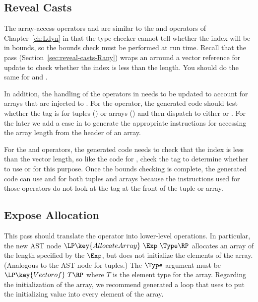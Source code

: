 \documentclass[7x10,nocrop]{TimesAPriori_MIT}%
\begin{document}
{\subsection{Reveal Casts}

The array-access operators  and
 are similar to the  and
 operators of Chapter~\ref{ch:Ldyn} in
that the type checker cannot tell whether the index will be in bounds,
so the bounds check must be performed at run time.  Recall that the
 pass (Section~\ref{sec:reveal-casts-Rany}) wraps
an  arround a vector reference for update to check whether
the index is less than the length.  You should do the same for
 and  .

In addition, the handling of the  operators in
 needs to be updated to account for arrays that are
injected to . For the  operator, the
generated code should test whether the tag is for tuples ()
or arrays () and then dispatch to either
 or .  For the later
we add a case in  to generate the
appropriate instructions for accessing the array length from the
header of an array.

For the  and  operators,
the generated code needs to check that the index is less than the
vector length, so like the code for , check
the tag to determine whether to use  or
 for this purpose.  Once the bounds checking
is complete, the generated code can use  and
 for both tuples and arrays because the
instructions used for those operators do not look at the tag at the
front of the tuple or array.

\subsection{Expose Allocation}

This pass should translate the  operator into
lower-level operations. In particular, the new AST node
$\LP\key{AllocateArray}~\Exp~\Type\RP$ allocates an array of the
length specified by the $\Exp$, but does not initialize the elements
of the array. (Analogous to the  AST node for tuples.)
The $\Type$ argument must be $\LP\key{Vectorof}~T\RP$ where $T$ is the
element type for the array. Regarding the initialization of the array,
we recommend generated a  loop that uses
 to put the initializing value into every element of
the array.

}
\end{document}
